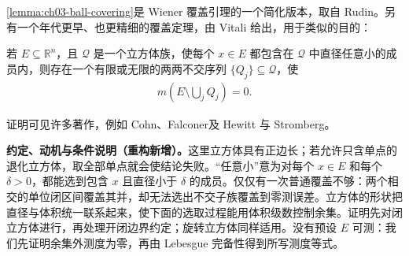 \documentclass[../../main.tex]{subfiles}%
\begin{document}
\cref{lemma:ch03-ball-covering}是 Wiener 覆盖引理的一个简化版本，取自 Rudin\cite{folland-bib-125}。另有一个年代更早、也更精细的覆盖定理，由 Vitali 给出，用于类似的目的：
\begin{theorem}\label{theorem:ch03-vitali-covering}
若 $E\subseteq\mathbb R^n$，且 $\mathcal Q$ 是一个立方体族，使每个 $x\in E$ 都包含在 $\mathcal Q$ 中直径任意小的成员内，则存在一个有限或无限的两两不交序列 $\{Q_j\}\subseteq\mathcal Q$，使
\begin{align*}
m\left(E\setminus\bigcup_jQ_j\right)=0.
\end{align*}
\end{theorem}
证明可见许多著作，例如 Cohn\cite[\S6.2]{folland-bib-027}、Falconer\cite[\S1.3]{folland-bib-039}及 Hewitt 与 Stromberg\cite[\S17]{folland-bib-076}。
\begin{remark}
\textbf{约定、动机与条件说明（重构新增）。}这里立方体具有正边长；若允许只含单点的退化立方体，取全部单点就会使结论失败。“任意小”意为对每个 $x\in E$ 和每个 $\delta>0$，都能选到包含 $x$ 且直径小于 $\delta$ 的成员。仅仅有一次普通覆盖不够：两个相交的单位闭区间覆盖其并，却无法选出不交子族覆盖到零测误差。立方体的形状把直径与体积统一联系起来，使下面的选取过程能用体积级数控制余集。证明先对闭立方体进行，再处理开闭边界约定；旋转立方体同样适用。没有预设 $E$ 可测：我们先证明余集外测度为零，再由 Lebesgue 完备性得到所写测度等式。
\end{remark}
\end{document}
